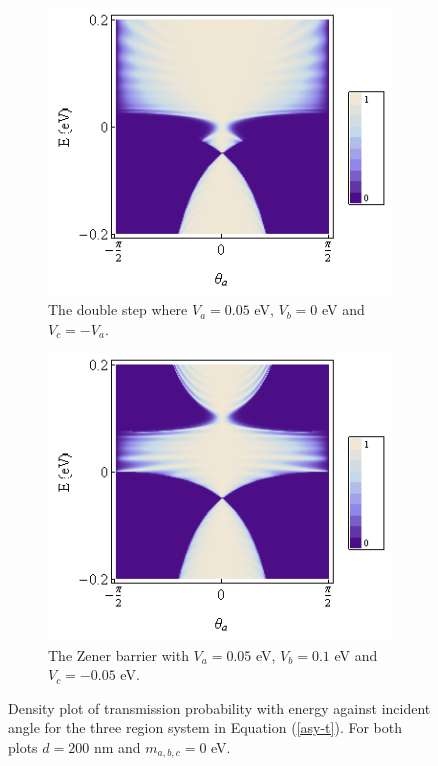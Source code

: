 		\begin{figure}[h]
			 \begin{subfigure}[h]{0.5\textwidth}
				\centerline{\includegraphics[scale=0.5]{images/asy-5}}
				\caption{The double step where $V_{a}=0.05$ eV, $V_{b}=0$ eV and $V_{c}=-V_{a}$.}
			\end{subfigure}
			\hspace{0.5cm}
			\begin{subfigure}[h]{0.5\textwidth}
				\centerline{\includegraphics[scale=0.5]{images/asy-6}}
				\caption{The Zener barrier with $V_{a}=0.05$ eV, $V_{b}=0.1$ eV and $V_{c}=-0.05$ eV.}
			\end{subfigure}
			\caption{Density plot of transmission probability with energy against incident angle for the three region system in Equation (\ref{asy-t}). For both plots $d=200$ nm and  $m_{a,b,c}=0$ eV.}
			\label{asy-5}
		\end{figure}

